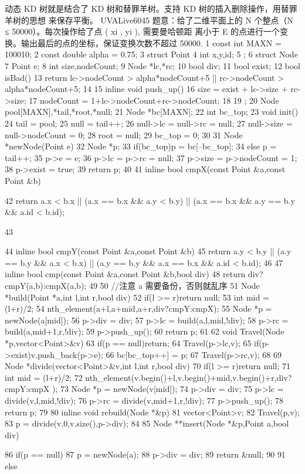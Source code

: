 \documentclass[11pt]{article}
\begin{document}
\begin{Code}
     动态 KD 树就是结合了 KD 树和替罪羊树。支持 KD 树的插入删除操作，用替罪羊树的思想
     来保存平衡。
     UVALive6045
     题意：给了二维平面上的 N 个整点（N ≤ 50000）。每次操作给了点 ( xi , yi ), 需要曼哈顿距
     离小于 E 的点进行一个变换。输出最后的点的坐标，保证变换次数不超过 50000.
 1   const int MAXN = 100010;
 2   const double alpha = 0.75;
 3   struct Point{
 4       int x,y,id;
 5   };
 6   struct Node{
 7       Point e;
 8       int size,nodeCount;
 9       Node *lc,*rc;
10       bool div;
11       bool exist;
12       bool isBad(){
13           return lc->nodeCount > alpha*nodeCount+5 || rc->nodeCount >
                 alpha*nodeCount+5;
14       }
15       inline void push_up(){
16           size = exist + lc->size + rc->size;
17           nodeCount = 1+lc->nodeCount+rc->nodeCount;
18       }
19   };
20   Node pool[MAXN],*tail,*root,*null;
21   Node *bc[MAXN];
22   int bc_top;
23   void init(){
24       tail = pool;
25       null = tail++;
26       null->lc = null->rc = null;
27       null->size = null->nodeCount = 0;
28       root = null;
29       bc_top = 0;
30   }
31   Node *newNode(Point e){
32       Node *p;
33       if(bc_top)p = bc[--bc_top];
34       else p = tail++;
35       p->e = e;
36       p->lc = p->rc = null;
37       p->size = p->nodeCount = 1;
38       p->exist = true;
39       return p;
40   }
41   inline bool cmpX(const Point &a,const Point &b){
42       return a.x < b.x || (a.x == b.x && a.y < b.y) || (a.x == b.x &&
             a.y == b.y && a.id < b.id);


43 }
44 inline bool cmpY(const Point &a,const Point &b){
45     return a.y < b.y || (a.y == b.y && a.x < b.x) || (a.y == b.y &&
           a.x == b.x && a.id < b.id);
46 }
47 inline bool cmp(const Point &a,const Point &b,bool div){
48     return div?cmpY(a,b):cmpX(a,b);
49 }
50 //注意 a 需要备份，否则就乱序
51 Node *build(Point *a,int l,int r,bool div){
52     if(l >= r)return null;
53     int mid = (l+r)/2;
54     nth_element(a+l,a+mid,a+r,div?cmpY:cmpX);
55     Node *p = newNode(a[mid]);
56     p->div = div;
57     p->lc = build(a,l,mid,!div);
58     p->rc = build(a,mid+1,r,!div);
59     p->push_up();
60     return p;
61 }
62 void Travel(Node *p,vector<Point>&v){
63     if(p == null)return;
64     Travel(p->lc,v);
65     if(p->exist)v.push_back(p->e);
66     bc[bc_top++] = p;
67     Travel(p->rc,v);
68 }
69 Node *divide(vector<Point>&v,int l,int r,bool div){
70     if(l >= r)return null;
71     int mid = (l+r)/2;
72     nth_element(v.begin()+l,v.begin()+mid,v.begin()+r,div?cmpY:cmpX
          );
73     Node *p = newNode(v[mid]);
74     p->div = div;
75     p->lc = divide(v,l,mid,!div);
76     p->rc = divide(v,mid+1,r,!div);
77     p->push_up();
78     return p;
79 }
80 inline void rebuild(Node *&p){
81     vector<Point>v;
82     Travel(p,v);
83     p = divide(v,0,v.size(),p->div);
84 }
85 Node **insert(Node *&p,Point a,bool div){
86     if(p == null){
87         p = newNode(a);
88         p->div = div;
89         return &null;
90     }
91     else {


}}
\end{Code}
\end{document}
